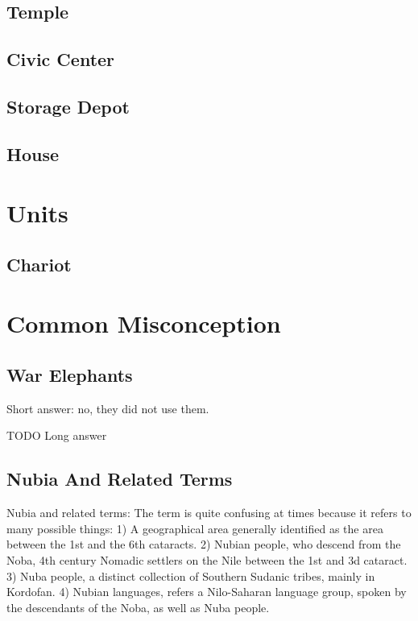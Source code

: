 \documentclass[a4paper,12pt]{scrreprt}
\begin{document}
\subsection{Temple}

\subsection{Civic Center}

\subsection{Storage Depot}

\subsection{House}



\section{Units}

\subsection{Chariot}

\section{Common Misconception}

\subsection{War Elephants}

Short answer: no, they did not use them.

TODO Long answer

\subsection{Nubia And Related Terms}

Nubia and related terms: The term is quite confusing at times because it refers to many possible things: 1) A geographical area generally identified as the area between the 1st and the 6th cataracts. 2) Nubian people, who descend from the Noba, 4th century Nomadic settlers on the Nile between the 1st and 3d cataract. 3) Nuba people, a distinct collection of Southern Sudanic tribes, mainly in Kordofan. 4) Nubian languages, refers a Nilo-Saharan language group, spoken by the descendants of the Noba, as well as Nuba people.\\  
\end{document}
